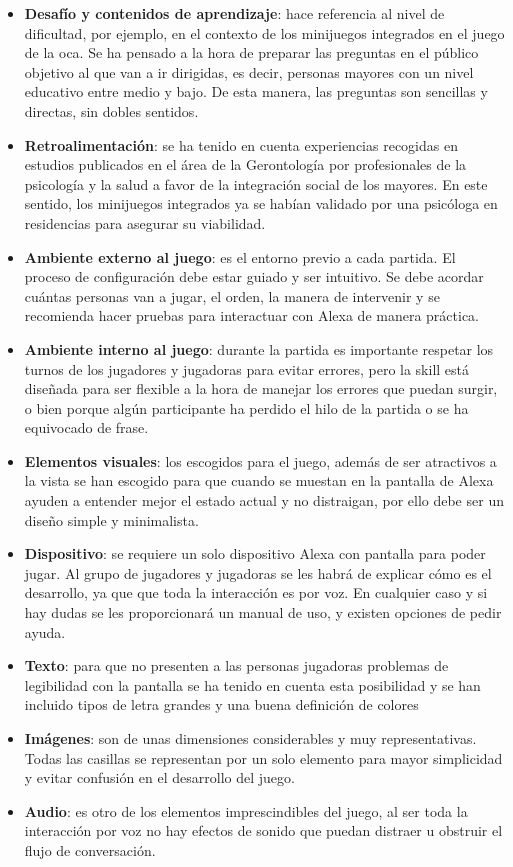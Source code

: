 \begin{itemize}
	\item \textbf{Desafío y contenidos de aprendizaje}: hace referencia al nivel de dificultad, por ejemplo, en el contexto de los minijuegos integrados en el juego de la oca. Se ha pensado a la hora de preparar las preguntas en el público objetivo al que van a ir dirigidas, es decir, personas mayores con un nivel educativo entre medio y bajo. De esta manera, las preguntas son sencillas y directas, sin dobles sentidos.
	\item \textbf{Retroalimentación}: se ha tenido en cuenta experiencias recogidas en estudios publicados en el área de la Gerontología por profesionales de la psicología y la salud a favor de la integración social de los mayores. En este sentido, los minijuegos integrados ya se habían validado por una psicóloga en residencias para asegurar su viabilidad.
	\item \textbf{Ambiente externo al juego}: es el entorno previo a cada partida. El proceso de configuración debe estar guiado y ser intuitivo. Se debe acordar cuántas personas van a jugar, el orden, la manera de intervenir y se recomienda hacer pruebas para interactuar con Alexa de manera práctica.
	\item \textbf{Ambiente interno al juego}: durante la partida es importante respetar los turnos de los jugadores y jugadoras para evitar errores, pero la skill está diseñada para ser flexible a la hora de manejar los errores que puedan surgir, o bien porque algún participante ha perdido el hilo de la partida o se ha equivocado de frase.
	\item \textbf{Elementos visuales}: los escogidos para el juego, además de ser atractivos a la vista se han escogido para que cuando se muestan en la pantalla de Alexa ayuden a entender mejor el estado actual y no distraigan, por ello debe ser un diseño simple y minimalista.
	\item \textbf{Dispositivo}: se requiere un solo dispositivo Alexa con pantalla para poder jugar. Al grupo de jugadores y jugadoras se les habrá de explicar cómo es el desarrollo, ya que que toda la interacción es por voz. En cualquier caso y si hay dudas se les proporcionará un manual de uso, y existen opciones de pedir ayuda.  
	\item \textbf{Texto}: para que no presenten a las personas jugadoras problemas de legibilidad con la pantalla se ha tenido en cuenta esta posibilidad y se han incluido tipos de letra grandes y una buena definición de colores
	\item \textbf{Imágenes}: son de unas dimensiones considerables y muy representativas. Todas las casillas se representan por un solo elemento para mayor simplicidad y evitar confusión en el desarrollo del juego. 
	\item \textbf{Audio}: es otro de los elementos imprescindibles del juego, al ser toda la interacción por voz no hay efectos de sonido que puedan distraer u obstruir el flujo de conversación.
\end{itemize}



